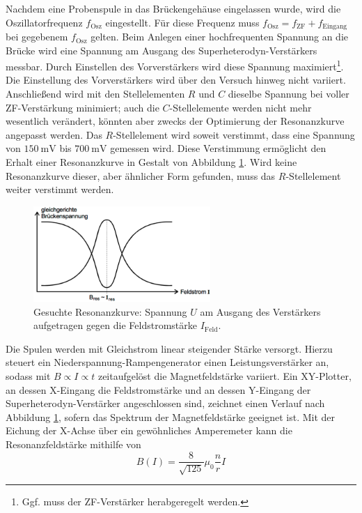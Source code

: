 Nachdem eine Probenspule in das Brückengehäuse eingelassen wurde, wird die Oszillatorfrequenz
$f_\text{Osz}$ eingestellt. Für diese Frequenz muss $f_\text{Osz}=f_\text{ZF}+f_\text{Eingang}$
bei gegebenem $f_\text{Osz}$ gelten. Beim Anlegen einer hochfrequenten Spannung an
die Brücke wird eine Spannung am Ausgang des Superheterodyn-Verstärkers messbar.
Durch Einstellen des Vorverstärkers wird diese Spannung maximiert\footnote{Ggf. muss der
ZF-Verstärker herabgeregelt werden.}. Die Einstellung des Vorverstärkers wird über
den Versuch hinweg nicht variiert.
Anschließend wird mit den Stellelementen $R$ und $C$ dieselbe Spannung bei voller
ZF-Verstärkung minimiert; auch die $C$-Stellelemente werden nicht mehr wesentlich verändert,
könnten aber zwecks der Optimierung der Resonanzkurve angepasst werden.
Das $R$-Stellelement wird soweit verstimmt, dass eine Spannung von $\SI{150}{\milli\volt}$
bis $\SI{700}{\milli\volt}$ gemessen wird. Diese Verstimmung ermöglicht den Erhalt
einer Resonanzkurve in Gestalt von Abbildung \ref{fig:res_signal}. Wird keine Resonanzkurve
dieser, aber ähnlicher Form gefunden, muss das $R$-Stellelement weiter verstimmt werden.
\begin{figure}
  \centering
  \includegraphics[width=0.6\textwidth]{graphics/res_signal.png}
  \caption{Gesuchte Resonanzkurve: Spannung $U$ am Ausgang des Verstärkers aufgetragen
  gegen die Feldstromstärke $I_\text{Feld}$. \cite{skript}}
  \label{fig:res_signal}
\end{figure}

Die Spulen werden mit Gleichstrom linear steigender Stärke versorgt. Hierzu steuert
ein Niederspannung-Rampengenerator einen Leistungsverstärker an, sodass mit $B\propto I\propto t$
zeitaufgelöst die Magnetfeldstärke variiert. Ein XY-Plotter, an dessen X-Eingang
die Feldstromstärke und an dessen Y-Eingang der Superheterodyn-Verstärker angeschlossen sind,
zeichnet einen Verlauf nach Abbildung \ref{fig:res_signal}, sofern das Spektrum
der Magnetfeldstärke geeignet ist. Mit der Eichung der X-Achse über ein gewöhnliches
Amperemeter kann die Resonanzfeldstärke mithilfe von
\begin{equation}
    B(I)= \frac{8}{\sqrt{125}}\mu_0\frac{n}{r}I
\end{equation}
